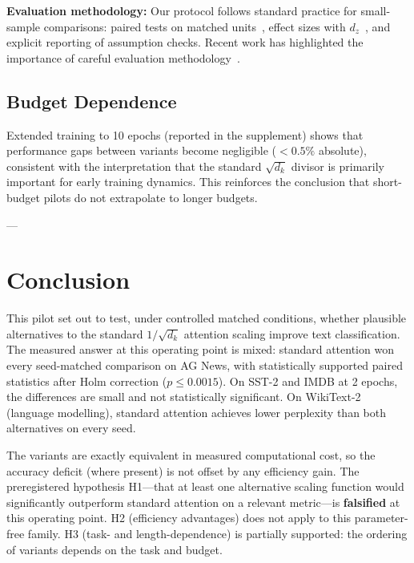 \documentclass[10pt,a4paper]{article}
\begin{document}
\textbf{Evaluation methodology:} Our protocol follows standard practice for small-sample comparisons: paired tests on matched units~\cite{holm1979}, effect sizes with $d_z$~\cite{cohen1988}, and explicit reporting of assumption checks. Recent work has highlighted the importance of careful evaluation methodology~\cite{dong2021,zhai2023}.

\subsection{Budget Dependence}

Extended training to 10 epochs (reported in the supplement) shows that performance gaps between variants become negligible ($<0.5\%$ absolute), consistent with the interpretation that the standard $\sqrt{d_k}$ divisor is primarily important for early training dynamics. This reinforces the conclusion that short-budget pilots do not extrapolate to longer budgets.

---

\section{Conclusion}

This pilot set out to test, under controlled matched conditions, whether plausible alternatives to the standard $1/\sqrt{d_k}$ attention scaling improve text classification. The measured answer at this operating point is mixed: standard attention won every seed-matched comparison on AG News, with statistically supported paired statistics after Holm correction ($p \leq 0.0015$). On SST-2 and IMDB at 2 epochs, the differences are small and not statistically significant. On WikiText-2 (language modelling), standard attention achieves lower perplexity than both alternatives on every seed.

The variants are exactly equivalent in measured computational cost, so the accuracy deficit (where present) is not offset by any efficiency gain. The preregistered hypothesis H1---that at least one alternative scaling function would significantly outperform standard attention on a relevant metric---is \textbf{falsified} at this operating point. H2 (efficiency advantages) does not apply to this parameter-free family. H3 (task- and length-dependence) is partially supported: the ordering of variants depends on the task and budget.
\end{document}
